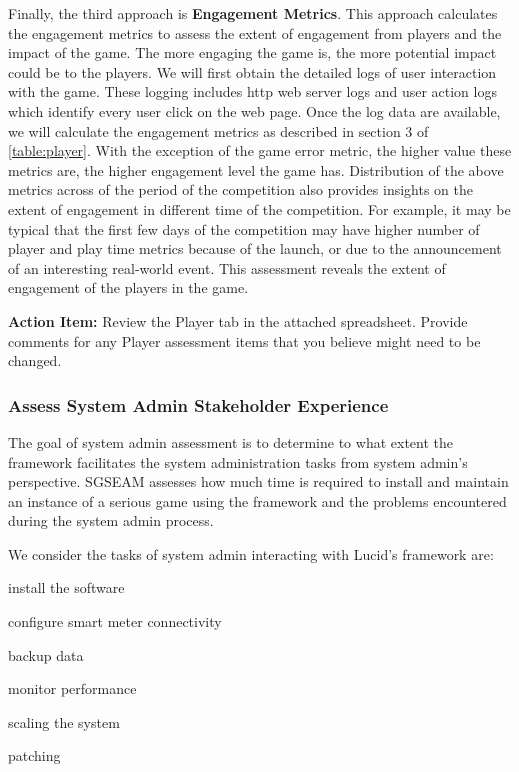 Finally, the third approach is {\bf Engagement Metrics}. This approach calculates the engagement metrics to assess the extent of engagement from players and the impact of the game. The more engaging the game is, the more potential impact could be to the players. We will first obtain the detailed logs of user interaction with the game. These logging includes http web server logs and user action logs which identify every user click on the web page. Once the log data are available, we will calculate the engagement metrics as described in section 3 of \autoref{table:player}. With the exception of the game error metric, the higher value these metrics are, the higher engagement level the game has. Distribution of the above metrics across of the period of the competition also provides insights on the extent of engagement in different time of the competition. For example, it may be typical that the first few days of the competition may have higher number of player and play time metrics because 
of the launch, or due to the announcement of an interesting real-world event. This assessment reveals the extent of engagement of the players in the game.

\begin{shadebox}
{\bf Action Item:} Review the Player tab in the attached
spreadsheet.  Provide comments for any Player assessment items that
you believe might need to be changed. 
\end{shadebox}

\subsubsection{Assess System Admin Stakeholder Experience}

The goal of system admin assessment is to determine to what extent the 
framework facilitates the system administration tasks from system admin's perspective. SGSEAM 
assesses how much time is required to install and maintain an instance of a serious game using the 
framework and the problems encountered  during the system admin process.

We consider the tasks of system admin interacting with Lucid's framework are:
\begin{compactenum}
    \item install the software
    \item configure smart meter connectivity
    \item backup data
    \item monitor performance
    \item scaling the system
    \item patching
\end{compactenum}

